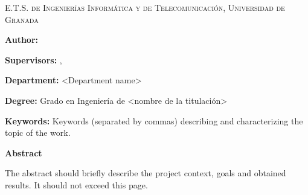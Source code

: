 
\pagestyle{fancy}

\begin{center}
	\scshape
	E.T.S. de Ingenierías Informática y de Telecomunicación, Universidad de Granada
\end{center}

\bigskip

\begin{center}
	\Large \scshape
	\textbf{\tfgtitlenameENG}
\end{center}

\bigskip \bigskip \bigskip

\begin{minipage}{\textwidth}

\textbf{Author:} \tfgauthorname

\medskip

\textbf{Supervisors:} \tfgtutornameA , \tfgtutornameB

\medskip


\medskip

\textbf{Department:} <Department name>

\medskip

\textbf{Degree:} Grado en Ingeniería de <nombre de la titulación>

\medskip

\textbf{Keywords:} Keywords (separated by commas) describing and characterizing the topic of the work.

\bigskip \bigskip


\end{minipage}

\begin{center}
	\textbf{Abstract}
\end{center}

The abstract should briefly describe the project context, goals and
obtained results. It should not exceed this page.

\blankpage
